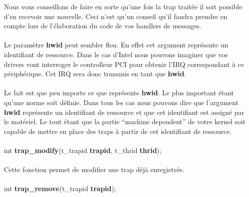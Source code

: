 \documentclass[10pt,a4wide]{article}
\begin{document}
Nous vous conseillons de faire en sorte qu'une fois la trap trait\'ee il
soit possible d'en recevoir une nouvelle. Ceci n'est qu'un conseil qu'il
faudra prendre en compte lors de l'\'elaboration du code de vos handlers
de messages.

\paragraph{}

Le param\`etre \textbf{hwid} peut sembler flou. En effet cet argument
repr\'esente un identifiant de ressource. Dans le cas d'Intel nous pouvons
imaginer que vos drivers vont interroger le controlleur PCI pour obtenir
l'IRQ correspondant \`a ce p\'eriph\'erique. Cet IRQ sera donc
transmis en tant que \textbf{hwid}.

\paragraph{}

Le fait est que peu importe ce que repr\'esente \textbf{hwid}. Le plus
important \'etant qu'une norme soit d\'efinie. Dans tous les cas nous pouvons
dire que l'argument \textbf{hwid} repr\'esente un identifiant de ressource
et que cet identifiant est assign\'e par le mat\'eriel. Le tout \'etant
que la partie ``machine dependent'' de votre kernel soit capable de mettre
en place des traps \`a partir de cet identifiant de ressource.

\paragraph{}

\hspace{1.5cm}int \textbf{trap\_modify}(t\_trapid \textbf{trapid},
                               	        t\_thrid \textbf{thrid});

\paragraph{}

Cette fonction permet de modifier une trap d\'ej\`a enregistr\'ee.

\paragraph{}

\hspace{1.5cm}int \textbf{trap\_remove}(t\_trapid \textbf{trapid});
\end{document}
